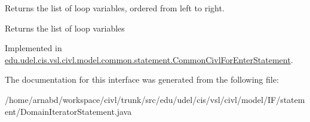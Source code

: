 Returns the list of loop variables, ordered from left to right. 

\begin{DoxyReturn}{Returns}
the list of loop variables 
\end{DoxyReturn}


Implemented in \hyperlink{classedu_1_1udel_1_1cis_1_1vsl_1_1civl_1_1model_1_1common_1_1statement_1_1CommonCivlForEnterStatement_a3858731bfc99b10d69deb441f0f340b7}{edu.\+udel.\+cis.\+vsl.\+civl.\+model.\+common.\+statement.\+Common\+Civl\+For\+Enter\+Statement}.



The documentation for this interface was generated from the following file\+:\begin{DoxyCompactItemize}
\item 
/home/arnabd/workspace/civl/trunk/src/edu/udel/cis/vsl/civl/model/\+I\+F/statement/Domain\+Iterator\+Statement.\+java\end{DoxyCompactItemize}
